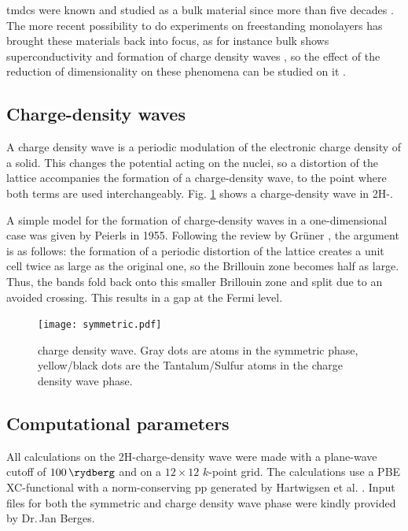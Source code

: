 \documentclass[main.tex]{subfiles}
\begin{document}
\acrshort{tmdc}s were known and studied as a bulk material since more than five decades \cite{wilson_transition_1969}.
The more recent possibility to do experiments on freestanding monolayers \cite{novoselov_two-dimensional_2005} has brought these materials back into focus,  as for instance bulk \TaS shows superconductivity \cite{nagata_superconductivity_1992} and formation of charge density waves \cite{wilson_charge-density_1974}, so the effect of the reduction of dimensionality on these phenomena can be studied on it \cite{navarro-moratalla_enhanced_2016,hall_environmental_2019}.

\subsection{Charge-density waves}

A charge density wave is a periodic modulation of the electronic charge density of a solid.
This changes the potential acting on the nuclei, so a distortion of the lattice accompanies the formation of a charge-density wave, to the point where both terms are used interchangeably.
Fig. \ref{fig:tas2_cdw_structure} shows a charge-density wave in 2H-\TaS.

A simple model for the formation of charge-density waves in a one-dimensional case was given by Peierls in 1955.
Following the review by Grüner \cite{gruner_dynamics_1988}, the argument is as follows: 
the formation of a periodic distortion of the lattice creates a unit cell twice as large as the original one, so the Brillouin zone becomes half as large.
Thus, the bands fold back onto this smaller Brillouin zone and split due to an avoided crossing.
This results in a gap at the Fermi level.

\begin{figure}[h]
    \centering
    \texttt{[image: symmetric.pdf]}
    \caption{\TaS charge density wave. Gray dots are atoms in the symmetric phase, yellow/black dots are the Tantalum/Sulfur atoms in the charge density wave phase.}
    \label{fig:tas2_cdw_structure}
\end{figure}


\subsection{Computational parameters}

All calculations on the 2H-\TaS charge-density wave were made with a plane-wave cutoff of \(\SI{100}{\rydberg}\) and on a \(12\times12\) \(k\)-point grid.
The calculations use a PBE XC-functional with a norm-conserving \acrshort{pp} generated by Hartwigsen et al. \cite{hartwigsen_relativistic_1998}.
Input files for both the symmetric and charge density wave phase were kindly provided by Dr.\,Jan Berges.
\end{document}
